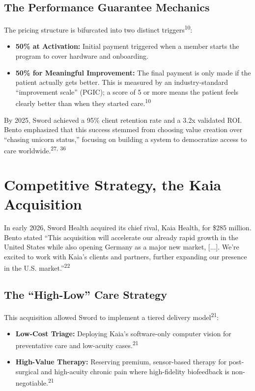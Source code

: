 \documentclass[12pt]{article}
\begin{document}
\subsection{The Performance Guarantee Mechanics}
The pricing structure is bifurcated into two distinct triggers\textsuperscript{10}:
\begin{itemize}
    \item \textbf{50\% at Activation:} Initial payment triggered when a member starts the program to cover hardware and onboarding.
    \item \textbf{50\% for Meaningful Improvement:} The final payment is only made if the patient actually gets better. This is measured by an industry-standard ``improvement scale'' (PGIC); a score of 5 or more means the patient feels clearly better than when they started care.\textsuperscript{10}
\end{itemize}

By 2025, Sword achieved a 95\% client retention rate and a 3.2x validated ROI. Bento emphasized that this success stemmed from choosing value creation over ``chasing unicorn status,'' focusing on building a system to democratize access to care worldwide.\textsuperscript{27, 36}

\section{Competitive Strategy, the Kaia Acquisition}
In early 2026, Sword Health acquired its chief rival, Kaia Health, for \$285 million. Bento stated ``This acquisition will accelerate our already rapid growth in the United States while also opening Germany as a major new market, [...]. We’re excited to work with Kaia’s clients and partners, further expanding our presence in the U.S. market.''\textsuperscript{22}

\subsection{The ``High-Low'' Care Strategy}
This acquisition allowed Sword to implement a tiered delivery model\textsuperscript{21}:
\begin{itemize}
    \item \textbf{Low-Cost Triage:} Deploying Kaia’s software-only computer vision for preventative care and low-acuity cases.\textsuperscript{21}
    \item \textbf{High-Value Therapy:} Reserving premium, sensor-based therapy for post-surgical and high-acuity chronic pain where high-fidelity biofeedback is non-negotiable.\textsuperscript{21}
\end{itemize}
\end{document}
